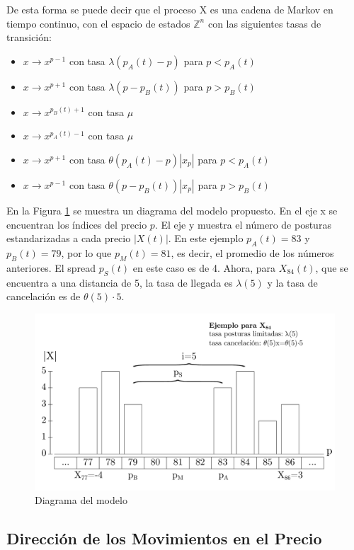 \documentclass[11pt]{article}
\numberwithin{equation}{section} %
\begin{document}
De esta forma se puede decir que el proceso X es una cadena de Markov en tiempo continuo, con el espacio de estados $\mathbb{Z}^n$ con las siguientes tasas de transición:
\begin{itemize}
\item $x\rightarrow x^{p-1}$ con tasa $\lambda(p_A(t)-p)$ para $p<p_A(t)$
\item $x\rightarrow x^{p+1}$ con tasa $\lambda(p-p_B(t))$ para $p>p_B(t)$
\item $x\rightarrow x^{p_B(t)+1}$ con tasa $\mu$
\item $x\rightarrow x^{p_A(t)-1}$ con tasa $\mu$
\item $x\rightarrow x^{p+1}$ con tasa $\theta(p_A(t)-p)|x_p|$ para $p<p_A(t)$
\item $x\rightarrow x^{p-1}$ con tasa $\theta(p-p_B(t))|x_p|$ para $p>p_B(t)$
\end{itemize}

En la Figura \ref{model} se muestra un diagrama del modelo propuesto. En el eje x se encuentran los índices del precio $p$. El eje y muestra  el número de posturas estandarizadas a cada precio $|X(t)|$. En este ejemplo $p_A(t)=83$ y $p_B(t)=79$, por lo que $p_M(t)=81$, es decir, el promedio de los números anteriores. El spread $p_S(t)$ en este caso es de 4. Ahora, para $X_{84}(t)$, que se encuentra a una distancia de 5, la tasa de llegada es $\lambda(5)$ y la tasa de cancelación es de $\theta(5) \cdot 5$.

\begin{figure}[htbp] \centering
\includegraphics[scale=0.38,trim=0 1cm 0 1cm]{model.pdf}
\caption{Diagrama del modelo}
\label{model}
\end{figure}

\subsection{Dirección de los Movimientos en el Precio}
\end{document}
